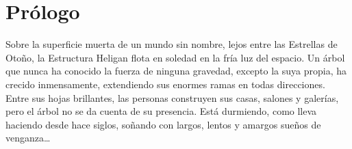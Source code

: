 \chapter*{Prólogo}

Sobre la superficie muerta de un mundo sin nombre, lejos entre las
Estrellas de Otoño, la Estructura Heligan flota en soledad en la fría
luz del espacio. Un árbol que nunca ha conocido la fuerza de ninguna
gravedad, excepto la suya propia, ha crecido inmensamente, extendiendo
sus enormes ramas en todas direcciones. Entre sus hojas brillantes, las
personas construyen sus casas, salones y galerías, pero el árbol no se
da cuenta de su presencia. Está durmiendo, como lleva haciendo desde
hace siglos, soñando con largos, lentos y amargos sueños de
venganza\ldots{}